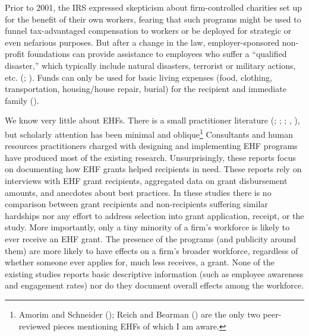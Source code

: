 \documentclass[
  11pt,
  oneside]{article}
\begin{document}
Prior to 2001, the IRS expressed skepticism about firm-controlled charities set up for the benefit of their own workers, fearing that such programs might be used to funnel tax-advantaged compensation to workers or be deployed for strategic or even nefarious purposes. But after a change in the law, employer-sponsored non-profit foundations can provide assistance to employees who suffer a ``qualified disaster,'' which typically include natural disasters, terrorist or military actions, etc. (; ). Funds can only be used for basic living expenses (food, clothing, transportation, housing/house repair, burial) for the recipient and immediate family ().

We know very little about EHFs. There is a small practitioner literature (; ; ; , ), but scholarly attention has been minimal and oblique\footnote{Amorim and Schneider (); Reich and Bearman () are the only two peer-reviewed pieces mentioning EHFs of which I am aware.} Consultants and human resources practitioners charged with designing and implementing EHF programs have produced most of the existing research. Unsurprisingly, these reports focus on documenting how EHF grants helped recipients in need. These reports rely on interviews with EHF grant recipients, aggregated data on grant disbursement amounts, and anecdotes about best practices. In these studies there is no comparison between grant recipients and non-recipients suffering similar hardships nor any effort to address selection into grant application, receipt, or the study. More importantly, only a tiny minority of a firm's workforce is likely to ever receive an EHF grant. The presence of the programs (and publicity around them) are more likely to have effects on a firm's broader workforce, regardless of whether someone ever applies for, much less receives, a grant. None of the existing studies reports basic descriptive information (such as employee awareness and engagement rates) nor do they document overall effects among the workforce.
\end{document}
